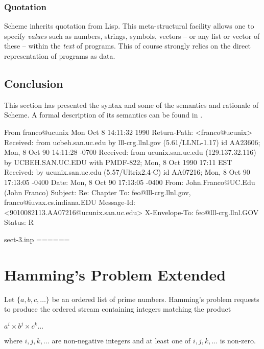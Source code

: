 \subsubsection{Quotation}

Scheme inherits quotation from Lisp.  This meta-structural
facility allows one to specify {\em values} such as numbers, strings,
symbols, vectors -- or any list or vector of these -- within the {\em
text} of programs.  This of course strongly relies on the direct
representation of programs as data.


\subsection{Conclusion}

This section has presented the syntax and some of the semantics and
rationale of Scheme.  A formal description of its semantics can be
found in \cite{rrr}.


From franco@ucunix Mon Oct  8 14:11:32 1990
Return-Path: <franco@ucunix>
Received: from ucbeh.san.uc.edu by lll-crg.llnl.gov (5.61/LLNL-1.17)
	id AA23606; Mon, 8 Oct 90 14:11:28 -0700
Received: from ucunix.san.uc.edu (129.137.32.116) by UCBEH.SAN.UC.EDU with
 PMDF-822; Mon, 8 Oct 1990 17:11 EST
Received: by ucunix.san.uc.edu (5.57/Ultrix2.4-C) id AA07216; Mon, 8 Oct 90
 17:13:05 -0400
Date: Mon, 8 Oct 90 17:13:05 -0400
From: John.Franco@UC.Edu (John Franco)
Subject: Re:  Chapter
To: feo@lll-crg.llnl.gov, franco@iuvax.cs.indiana.EDU
Message-Id: <9010082113.AA07216@ucunix.san.uc.edu>
X-Envelope-To: feo@lll-crg.llnl.GOV
Status: R

sect-3.inp
======

\section{Hamming's Problem Extended}

Let $\{a, b, c, \ldots\}$ be an ordered list of prime numbers.  Hamming's
problem requests to produce the ordered stream containing integers matching
the product

\begin{center}
$a^i \times b^j \times c^k \ldots$
\end{center}

\noindent
where $i, j, k, \ldots$ are non-negative integers and at least one of
$i, j, k, \ldots$ is non-zero.


